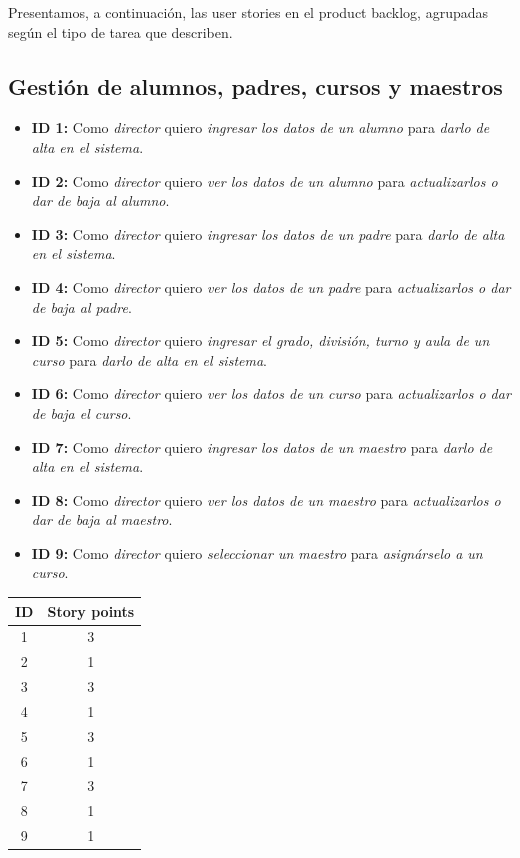 \documentclass[a4paper, 10pt, twoside]{article}
\newenvironment{stories}{
  \begin{itemize}
}{
  \end{itemize}
}
\newcommand{\story}[4]{
  \item
  \textbf{ID #1:} Como \emph{#2} quiero \emph{#3} para \emph{#4}.
}
\begin{document}
Presentamos, a continuación, las user stories en el product backlog, agrupadas según el tipo de tarea que describen.


\subsection{Gestión de alumnos, padres, cursos y maestros}

\begin{stories}
  \story{1}{director}
        {ingresar los datos de un alumno}
        {darlo de alta en el sistema} 

  \story{2}{director}
        {ver los datos de un alumno}
        {actualizarlos o dar de baja al alumno} 

  \story{3}{director}
        {ingresar los datos de un padre}
        {darlo de alta en el sistema} 

  \story{4}{director}
        {ver los datos de un padre}
        {actualizarlos o dar de baja al padre} 

  \story{5}{director}
        {ingresar el grado, división, turno y aula de un curso}
        {darlo de alta en el sistema} 

  \story{6}{director}
        {ver los datos de un curso}
        {actualizarlos o dar de baja el curso} 

  \story{7}{director}
        {ingresar los datos de un maestro}
        {darlo de alta en el sistema} 

  \story{8}{director}
        {ver los datos de un maestro}
        {actualizarlos o dar de baja al maestro} 

  \story{9}{director}
        {seleccionar un maestro}
        {asignárselo a un curso} 
\end{stories}

\begin{center}
\begin{tabular}{|c|c|}
\hline
ID & Story points\\
\hline
1 & 3\\
2 & 1\\
3 & 3\\
4 & 1\\
5 & 3\\
6 & 1\\
7 & 3\\
8 & 1\\
9 & 1\\
\hline
\end{tabular}
\end{center}
\end{document}
